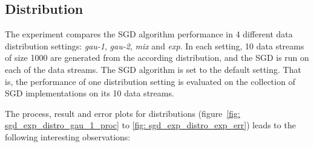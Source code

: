 \subsection{Distribution}
\label{subsec: sgd_exp_distro}
The experiment compares the SGD algorithm performance in 4 different data distribution settings: \textit{gau-1}, \textit{gau-2}, \textit{mix} and \textit{exp}. In each setting, 10 data streams of size 1000 are generated from the according distribution, and the SGD is run on each of the data streams. The SGD algorithm is set to the default setting. That is, the performance of one distribution setting is evaluated on the collection of SGD implementations on its 10 data streams.

The process, result and error plots for distributions (figure~\ref{fig: sgd_exp_distro_gau_1_proc} to \ref{fig: sgd_exp_distro_exp_err}) leads to the following interesting observations:
